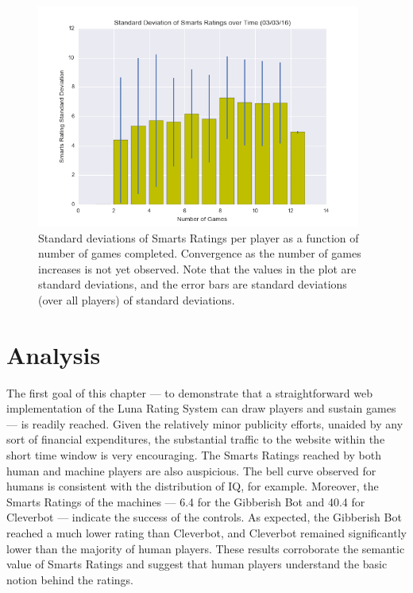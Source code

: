 \begin{figure}
\includegraphics[width=0.95\textwidth]{figures/varianceGamesPlayed.png}
\caption{\label{smartRatingStds} Standard deviations of Smarts Ratings per player as a function of number of games completed. Convergence as the number of games increases is not yet observed. Note that the values in the plot are standard deviations, and the error bars are standard deviations (over all players) of standard deviations.}
\end{figure}

\section{Analysis}

The first goal of this chapter --- to demonstrate that a straightforward web implementation of the Luna Rating System can draw players and sustain games --- is readily reached. Given the relatively minor publicity efforts, unaided by any sort of financial expenditures, the substantial traffic to the website within the short time window is very encouraging. The Smarts Ratings reached by both human and machine players are also auspicious. The bell curve observed for humans is consistent with the distribution of IQ, for example. Moreover, the Smarts Ratings of the machines --- 6.4 for the Gibberish Bot and 40.4 for Cleverbot --- indicate the success of the controls. As expected, the Gibberish Bot reached a much lower rating than Cleverbot, and Cleverbot remained significantly lower than the majority of human players. These results corroborate the semantic value of Smarts Ratings and suggest that human players understand the basic notion behind the ratings.

